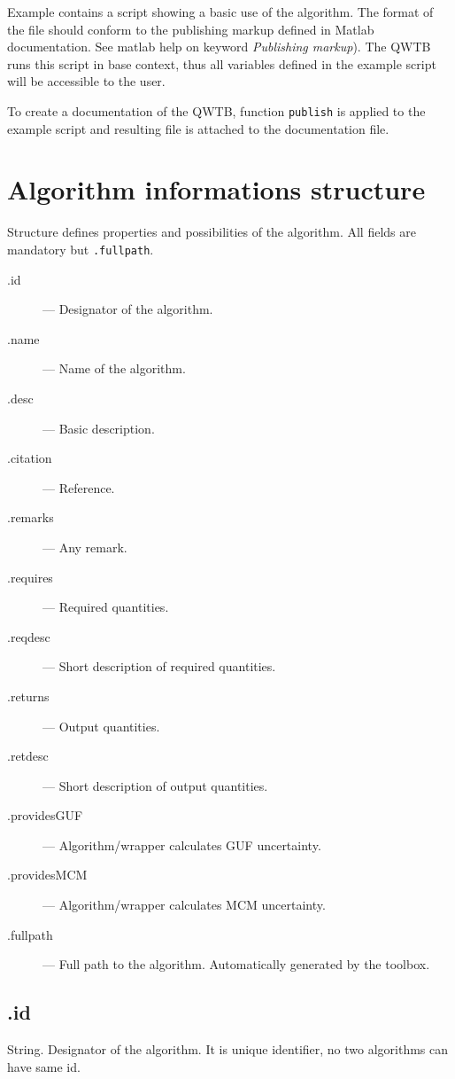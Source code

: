 \documentclass[12pt]{article} %
\begin{document}
Example contains a script showing a basic use of the algorithm. The format of the file should
conform to the publishing markup defined in Matlab documentation. See matlab help on keyword
\emph{Publishing markup}). The QWTB runs this script in base context, thus all variables defined in
the example script will be accessible to the user.

To create a documentation of the QWTB, function \lstinline{publish} is applied to the example script
and resulting file is attached to the documentation file.

\section{Algorithm informations structure} %
\label{structalginfo}
Structure defines properties and possibilities of the algorithm. All fields are mandatory but
\lstinline{.fullpath}.

\begin{description}
        \item [\textsf{.id}] --- Designator of the algorithm.
        \item [\textsf{.name}] ---  Name of the algorithm.
        \item [\textsf{.desc}] ---  Basic description.
        \item [\textsf{.citation}] ---  Reference.
        \item [\textsf{.remarks}] ---  Any remark.
        \item [\textsf{.requires}] ---  Required quantities.
        \item [\textsf{.reqdesc}] ---  Short description of required quantities.
        \item [\textsf{.returns}] ---  Output quantities.
        \item [\textsf{.retdesc}] ---  Short description of output quantities.
        \item [\textsf{.providesGUF}] ---  Algorithm/wrapper calculates GUF uncertainty.
        \item [\textsf{.providesMCM}] ---  Algorithm/wrapper calculates MCM uncertainty.
        \item [\textsf{.fullpath}] ---  Full path to the algorithm. Automatically generated by the toolbox.
\end{description}

\subsection{\textsf{.id}} %
String. Designator of the algorithm. It is unique identifier, no two algorithms can have same id.
\end{document}
